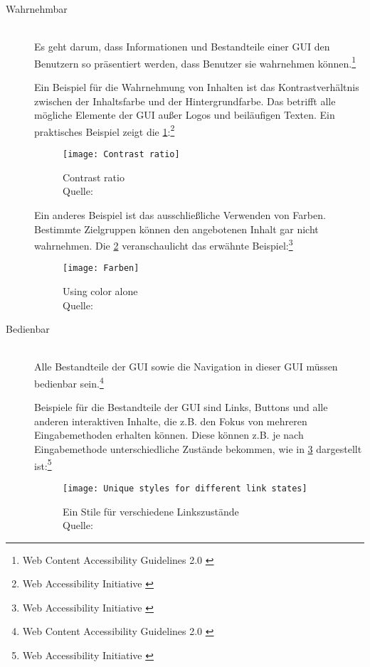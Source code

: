 \begin{description}
	\item [Wahrnehmbar]\hfill \\
	Es geht darum, dass Informationen und Bestandteile einer \ac{GUI} den Benutzern so präsentiert werden, dass Benutzer sie wahrnehmen 
	können.\footnote{Web Content Accessibility Guidelines 2.0 \cite{WCAG2.0}}
	
	Ein Beispiel für die Wahrnehmung von Inhalten ist das Kontrastverhältnis zwischen der Inhaltsfarbe und der Hintergrundfarbe. Das betrifft alle 
	mögliche Elemente der \ac{GUI} außer Logos und beiläufigen Texten. Ein praktisches Beispiel zeigt die \cref{fig:Contrast ratio}:\footnote{Web Accessibility 
	Initiative \cite{WAI}}
	
	\begin{figure}[H]
		\centering
		\texttt{[image: Contrast ratio]}
		\caption[Contrast ratio]{Contrast ratio \\Quelle: \cite{WAI}}
		\label{fig:Contrast ratio}
	\end{figure}
	
	Ein anderes Beispiel ist das ausschließliche Verwenden von Farben. Bestimmte Zielgruppen können den angebotenen Inhalt gar nicht wahrnehmen. Die 
	\cref{fig:using color alone} veranschaulicht das erwähnte Beispiel:\footnote{Web Accessibility Initiative \cite{WAI}}
	
	\begin{figure}[H]
		\centering
		\texttt{[image: Farben]}
		\caption[Using color alone]{Using color alone \\Quelle: \cite{WAI}}
		\label{fig:using color alone}
	\end{figure}
	
	\item [Bedienbar]\hfill \\
	Alle Bestandteile der \ac{GUI} sowie die Navigation in dieser \ac{GUI} müssen bedienbar sein.\footnote{Web Content Accessibility Guidelines 2.0 \cite{WCAG2.0}}
	
	Beispiele für die Bestandteile der \ac{GUI} sind Links, Buttons und alle anderen interaktiven Inhalte, die z.B. den Fokus von mehreren Eingabemethoden erhalten 
	können. Diese können z.B. je nach Eingabemethode unterschiedliche Zustände bekommen, wie in \cref{fig:Ein Stile für verschiedene Linkszustände} dargestellt 
	ist:\footnote{Web Accessibility Initiative \cite{WAI}}
	
	\begin{figure}[H]
		\centering
		\texttt{[image: Unique styles for different link states]}
		\caption[Ein Stil für verschiedene Linkzustände]{Ein Stile für verschiedene Linkszustände \\Quelle: \cite{WAI}}
		\label{fig:Ein Stile für verschiedene Linkszustände}
	\end{figure}
	

\end{description}

